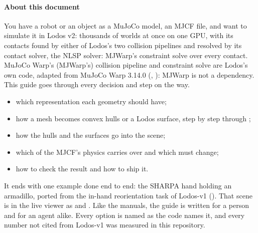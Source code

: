 



\paragraph{About this document}
You have a robot or an object as a MuJoCo model, an MJCF file, and want to simulate it in Lodos v2: thousands of worlds at once on one GPU, with its contacts found by either of Lodos's two collision pipelines and resolved by its contact solver, the NLSP solver: MJWarp's constraint solve over every contact. MuJoCo Warp's (MJWarp's) collision pipeline and constraint solve are Lodos's own code, adapted from MuJoCo Warp 3.14.0 (, ): MJWarp is not a dependency. This guide goes through every decision and step on the way.

\begin{itemize}
\item which representation each geometry should have;
\item how a mesh becomes convex hulls or a Lodos surface, step by step through ;
\item how the hulls and the surfaces go into the scene;
\item which of the MJCF's physics carries over and which must change;
\item how to check the result and how to ship it.
\end{itemize}

It ends with one example done end to end: the SHARPA hand holding an armadillo, ported from the in-hand reorientation task of Lodos-v1 (). That scene is in the live viewer as  and . Like the manuals, the guide is written for a person and for an agent alike. Every option is named as the code names it, and every number not cited from Lodos-v1 was measured in this repository.

